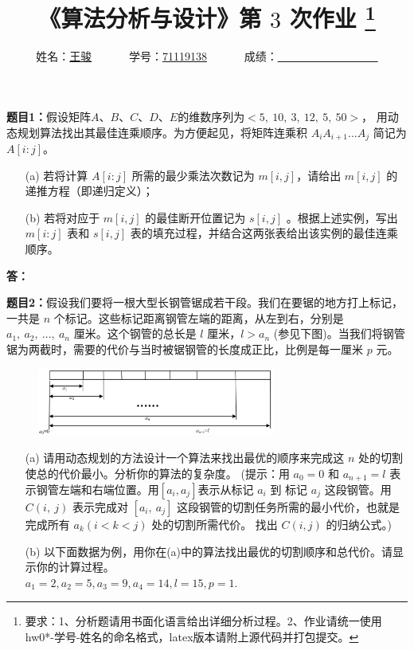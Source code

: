 \documentclass[12pt,a4paper]{article}
\begin{document}
\begin{CJK*}{UTF8}{gbsn}

	\title{
		{\textbf《算法分析与设计》第 {$3$} 次作业
			\footnote{要求：1、分析题请用书面化语言给出详细分析过程。2、作业请统一使用hw0*-学号-姓名的命名格式，latex版本请附上源代码并打包提交。}
		}
	}
	\date{}

	\author{
		姓名：\underline{王骏}~~~~~~
		学号：\underline{71119138}~~~~~~
		成绩：\underline{~~~~~~~~~~~~~~~~~~}
	}


	\noindent
	\section*{\bf \color{red}{算法分析题}}
	\noindent
	{\bf 题目1：}假设矩阵$A$、$B$、$C$、$D$、$E$的维数序列为$ <5,\ 10,\ 3,\ 12,\ 5,\ 50>$， 用动态规划算法找出其最佳连乘顺序。为方便起见，将矩阵连乘积 $A_iA_{i+1}...A_j$ 简记为 $A[i:j]$。
	\begin{enumerate}
		\item[(a)]  若将计算 $A[i:j]$ 所需的最少乘法次数记为 $m[i,j]$，请给出 $m[i,j]$ 的递推方程（即递归定义）；
		\item[(b)]  若将对应于 $m[i,j]$ 的最佳断开位置记为 $s[i,j]$ 。根据上述实例，写出 $m[i:j]$ 表和 $s[i,j]$ 表的填充过程，并结合这两张表给出该实例的最佳连乘顺序。
	\end{enumerate}

	\vspace{5pt}
	\noindent
	{\bf 答：}


	\vspace{10pt}
	\noindent
	{\bf 题目2：}假设我们要将一根大型长钢管锯成若干段。我们在要锯的地方打上标记，一共是 $n$ 个标记。这些标记距离钢管左端的距离，从左到右，分别是 $a_1,\ a_2,\  ...,\ a_n$ 厘米。这个钢管的总长是 $l$ 厘米，$l > a_n$ (参见下图)。当我们将钢管锯为两截时，需要的代价与当时被锯钢管的长度成正比，比例是每一厘米 $p$ 元。\\
	\begin{figure}[h]
		\centering %
		\includegraphics[width=0.7\textwidth]{2} %
	\end{figure}	

	\begin{enumerate}
		\item[(a)]  请用动态规划的方法设计一个算法来找出最优的顺序来完成这 $n$ 处的切割使总的代价最小。分析你的算法的复杂度。 (提示：用 $a_0 = 0$ 和 $a_{n+1} = l$ 表示钢管左端和右端位置。用$[a_i, a_j]$表示从标记 $a_i$ 到 标记 $a_j$ 这段钢管。用 $C(i,\ j)$ 表示完成对 $[a_i,\ a_j]$ 这段钢管的切割任务所需的最小代价，也就是完成所有 $a_k (i < k < j)$ 处的切割所需代价。 找出 $C(i, j)$ 的归纳公式。)
		\item[(b)]  以下面数据为例，用你在(a)中的算法找出最优的切割顺序和总代价。请显示你的计算过程。\\
			$a_1 = 2, a_2 = 5, a_3 = 9, a_4 = 14, l = 15, p = 1$.
	\end{enumerate}


\end{CJK*}
\end{document}
